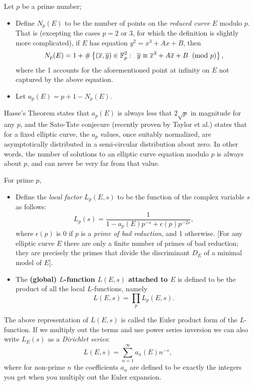 \begin{definition}
Let $p$ be a prime number;
\begin{itemize}
\item Define $N_p(E)$ to be the number of points on the {\it reduced curve} $E$ modulo $p$. That is (excepting the cases $p=2$ or $3$, for which the definition is slightly more complicated), if $E$ has equation $y^2 = x^3 + Ax+B$, then
\begin{equation}
N_p(E) = 1 + \#\left\{(\overline{x},\overline{y}) \in \mathbb{F}_p^2 : \;\; \overline{y} \equiv \overline{x}^3 + A\overline{x} + B \;\;(\text{mod }p)\right\},
\end{equation}
where the 1 accounts for the aforementioned point at infinity on $E$ not captured by the above equation.
\item Let $a_p(E) = p+1 - N_p(E)$.
\end{itemize}
\end{definition}
Hasse's Theorem states that $a_p(E)$ is always less that $2\sqrt{p}$ in magnitude for any $p$, and the Sato-Tate conjecure (recently proven by Taylor et al.) states that for a fixed elliptic curve, the $a_p$ values, once suitably normalized, are asymptotically distributed in a semi-circular distribution about zero. In other words, the number of solutions to an elliptic curve equation modulo $p$ is always about $p$, and can never be very far from that value.

\begin{definition}  For prime $p$,
\begin{itemize}
\item Define the {\it local factor} $L_p(E,s)$ to be the function of the complex variable $s$ as follows:
\begin{equation}
L_p(s) = \frac{1}{1-a_p(E)p^{-s} + \epsilon(p)p^{-2s}},
\end{equation}
where $\epsilon(p)$ is 0 if $p$ is a {\it prime of bad reduction}, and 1 otherwise. [For any elliptic curve $E$ there are only a finite number of primes of bad reduction; they are precisely the primes that divide the discriminant $D_E$ of a minimal model of $E$].
\item The {\bf (global) $L$-function $L(E,s)$ attached to $E$} is defined to be the product of all the local $L$-functions, namely
\begin{equation}
L(E,s)  = \prod_{p} L_p(E,s).
\end{equation}
\end{itemize}
\end{definition}
The above representation of $L(E,s)$ is called the Euler product form of the $L$-function. If we multiply out the terms and use power series inversion we can also write $L_E(s)$ as a {\it Dirichlet series}:
\begin{equation}
L(E,s) = \sum_{n=1}^{\infty} a_n(E) n^{-s},
\end{equation}
where for non-prime $n$ the coefficients $a_n$ are defined to be exactly the integers you get when you multiply out the Euler expansion.

